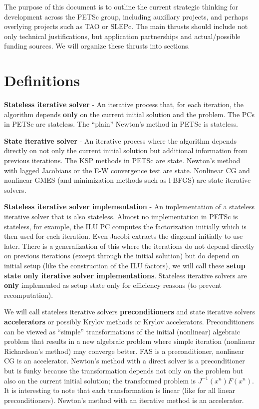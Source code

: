 	The purpose of this document is to outline the current strategic thinking for development across the PETSc
group, including auxillary projects, and perhaps overlying projects such as TAO or SLEPc. The main thrusts should
include not only technical justifications, but application partnerships and actual/possible funding sources. We will
organize these thrusts into sections.

\section{Definitions}

   {\bf Stateless iterative solver} - An iterative process that, for each iteration, the algorithm depends {\bf only}
on the current initial solution and the problem. The PCs in PETSc are stateless. The ``plain'' Newton's method in
PETSc is stateless.

   {\bf State iterative solver} - An iterative process where the algorithm depends directly on not only the current
initial solution but additional information from previous iterations. The KSP methods in PETSc are state. Newton's method
with lagged Jacobians or the E-W convergence test are state. Nonlinear CG and nonlinear GMES (and minimization methods
such as l-BFGS) are state iterative solvers.

   {\bf Stateless iterative solver implementation} - An implementation of a stateless iterative solver that is also 
stateless. Almost no implementation in PETSc is stateless, for example, the ILU PC computes the factorization initially
which is then used for each iteration. Even Jacobi extracts the diagonal initially to use later. There is a generalization
of this where the iterations do not depend directly on previous iterations (except through the initial solution) but
do depend on initial setup (like the construction of the ILU factors), we will call these {\bf setup state only iterative solver
implementations}. Stateless iterative solvers are {\bf only} 
implemented as setup state only for efficiency reasons (to prevent recomputation). 

  We will call stateless iterative solvers {\bf preconditioners} and state iterative solvers {\bf accelerators} or 
possibly Krylov methods or Krylov accelerators. Preconditioners can be viewed as ``simple'' transformations of the initial
(nonlinear) algebraic problem that results in a new algebraic problem where simple iteration (nonlinear Richardson's method)
may converge better. FAS is a preconditioner, nonlinear CG is an accelerator. Newton's method with a direct solver is a preconditioner but is 
funky because the transformation depends not only on the problem but also on the current initial solution; the transformed
problem is $ J^{-1}(x^{n}) F(x^n)$. It is interesting to note that each transformation is linear (like for all linear preconditioners).
Newton's method with an iterative method is an accelerator.


